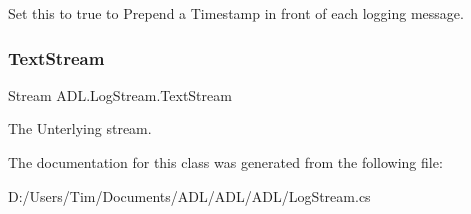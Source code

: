 Set this to true to Prepend a Timestamp in front of each logging message. 

\mbox{\label{class_a_d_l_1_1_log_stream_a65680991404e699fcafd4bc729504fc3}} 
\subsubsection{\texorpdfstring{Text\+Stream}{TextStream}}
{\footnotesize\ttfamily Stream A\+D\+L.\+Log\+Stream.\+Text\+Stream\hspace{0.3cm}{\ttfamily [get]}}



The Unterlying stream. 



The documentation for this class was generated from the following file\+:\begin{DoxyCompactItemize}
\item 
D\+:/\+Users/\+Tim/\+Documents/\+A\+D\+L/\+A\+D\+L/\+A\+D\+L/Log\+Stream.\+cs\end{DoxyCompactItemize}
